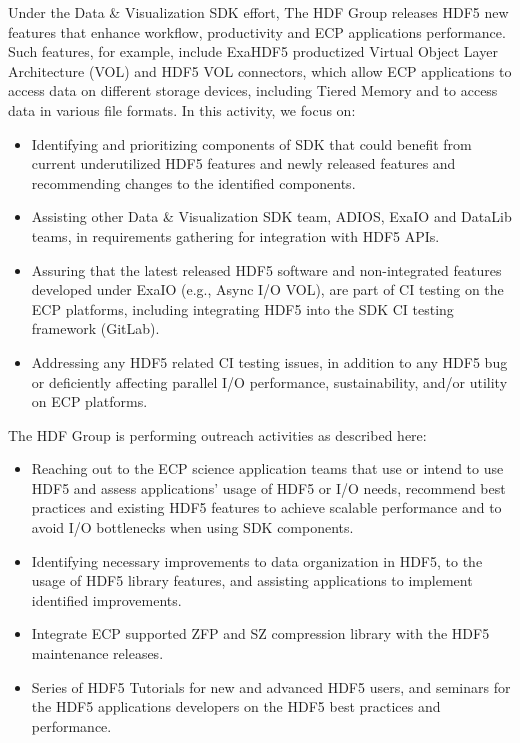 Under the Data & Visualization SDK effort, The HDF Group releases HDF5 new features that enhance workflow, productivity and ECP applications performance. Such features, for example, include ExaHDF5 productized Virtual Object Layer Architecture (VOL) and HDF5 VOL connectors, which allow ECP applications to access data on different storage devices, including Tiered Memory and to access data in various file formats. 
In this activity, we focus on:
\begin{itemize}
    \item Identifying and prioritizing components of SDK that could benefit from current underutilized HDF5 features and newly released features and recommending changes to the identified components.
    \item Assisting other Data & Visualization SDK team, ADIOS, ExaIO and DataLib teams, in requirements gathering for integration with HDF5 APIs.
    \item Assuring that the latest released HDF5 software and non-integrated features developed under ExaIO (e.g., Async I/O VOL), are part of CI testing on the ECP platforms, including integrating HDF5 into the SDK CI testing framework (GitLab).
    \item Addressing any HDF5 related CI testing issues, in addition to any HDF5 bug or deficiently affecting parallel I/O performance, sustainability, and/or utility on ECP platforms. 
\end{itemize}
The HDF Group is performing outreach activities as described here:
\begin{itemize}
    \item Reaching out to the ECP science application teams that use or intend to use HDF5 and assess applications’ usage of HDF5 or I/O needs, recommend best practices and existing HDF5 features to achieve scalable performance and to avoid I/O bottlenecks when using SDK components.
    \item Identifying necessary improvements to data organization in HDF5, to the usage of HDF5 library features, and assisting applications to implement identified improvements.
    \item Integrate ECP supported ZFP and SZ compression library with the HDF5 maintenance releases.
    \item Series of HDF5 Tutorials for new and advanced HDF5 users, and seminars for the HDF5 applications developers on the HDF5 best practices and performance.
\end{itemize}

